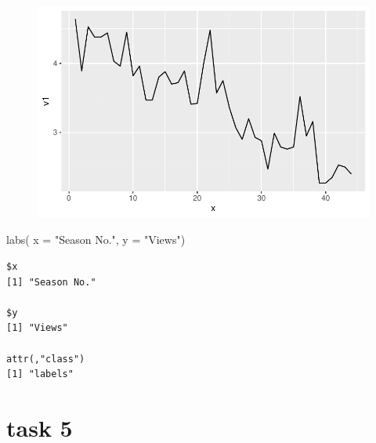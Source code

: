 \documentclass[
  letterpaper,
  DIV=11,
  numbers=noendperiod]{scrartcl}
\newenvironment{Shaded}{\begin{snugshade}}{\end{snugshade}}
\newcommand{\AttributeTok}[1]{\textcolor[rgb]{0.40,0.45,0.13}{#1}}
\newcommand{\FunctionTok}[1]{\textcolor[rgb]{0.28,0.35,0.67}{#1}}
\newcommand{\NormalTok}[1]{\textcolor[rgb]{0.00,0.23,0.31}{#1}}
\newcommand{\StringTok}[1]{\textcolor[rgb]{0.13,0.47,0.30}{#1}}
\begin{document}
\begin{figure}[H]

{\centering \includegraphics{MD_1_assignment_files/figure-pdf/unnamed-chunk-1-1.pdf}

}

\end{figure}

\begin{Shaded}
\begin{Highlighting}[]
  \FunctionTok{labs}\NormalTok{( }\AttributeTok{x =} \StringTok{"Season No."}\NormalTok{, }\AttributeTok{y =} \StringTok{"Views"}\NormalTok{)}
\end{Highlighting}
\end{Shaded}

\begin{verbatim}
$x
[1] "Season No."

$y
[1] "Views"

attr(,"class")
[1] "labels"
\end{verbatim}

\hypertarget{task-5}{%
\section{task 5}\label{task-5}}
\end{document}
